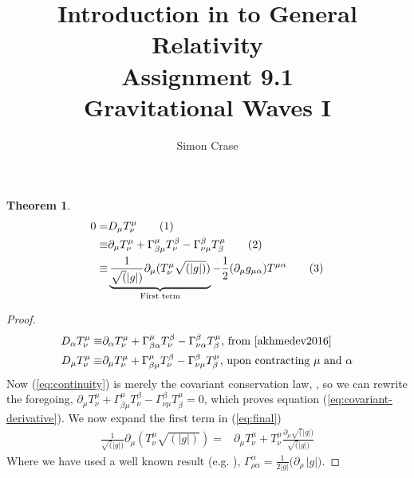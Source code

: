 \documentclass[]{article}
\title{Introduction in to General Relativity\\Assignment 9.1\\Gravitational Waves I}
\author{Simon Crase}
\newtheorem{theorem}{Theorem}
\newcommand\numberthis{\addtocounter{equation}{1}\tag{\theequation}}
\begin{document}
\maketitle


\begin{theorem}
	\begin{align*}
	0 =& D_{\mu} T^{\mu}_{\nu} \numberthis\label{eq:continuity} \\
	\equiv & \partial_{\mu} T^{\mu}_{\nu} + \Gamma^{\mu}_{\beta\mu}T^{\beta}_{\nu}-\Gamma^{\beta}_{\nu\mu}T^{\mu}_{\beta} \numberthis\label{eq:covariant-derivative}\\
	\equiv& \underbrace{\frac{1}{\sqrt(|g|)}\partial_{\mu}(T^{\mu}_{\nu}\sqrt{(|g|)})}_\text{First term} - \frac{1}{2}(\partial_{\mu}g_{\mu\alpha})T^{\mu\alpha} \numberthis\label{eq:final}
	\end{align*}
\end{theorem}

\begin{proof}
	\begin{align*}
	D_{\alpha} T^{\mu}_{\nu} 
	\equiv & \partial_{\alpha} T^{\mu}_{\nu} + \Gamma^{\mu}_{\beta\alpha}T^{\beta}_{\nu}-\Gamma^{\beta}_{\nu\alpha}T^{\mu}_{\beta} \text{, from \cite[(34)]{akhmedev2016}}\\
	D_{\mu} T^{\mu}_{\nu}
	\equiv & \partial_{\mu} T^{\mu}_{\nu} + \Gamma^{\mu}_{\beta\mu}T^{\beta}_{\nu}-\Gamma^{\beta}_{\nu\mu}T^{\mu}_{\beta}\text{, upon contracting $\mu$ and $\alpha$}
	\end{align*}
	Now (\ref{eq:continuity}) is merely the covariant conservation law, \cite[(80)]{akhmedev2016}, so we can rewrite the foregoing,
	$\partial_{\mu} T^{\mu}_{\nu} + \Gamma^{\mu}_{\beta\mu}T^{\beta}_{\nu}-\Gamma^{\beta}_{\nu\mu}T^{\mu}_{\beta}=0$, which proves equation (\ref{eq:covariant-derivative}).
	We now expand the first term in (\ref{eq:final})
	\begin{align*}
		\frac{1}{\sqrt(|g|)}\partial_{\mu}(T^{\mu}_{\nu}\sqrt{(|g|)}) =&\partial_{\mu}T^{\mu}_{\nu} + T^{\mu}_{\nu}\frac{\partial_{\mu}\sqrt(|g|)}{\sqrt(|g|)}
	\end{align*}
		Where we have used a well known result (e.g. \cite[equation (3.11)]{abs1965}), $\Gamma^{\alpha}_{\rho\alpha}=\frac{1}{2|g|}\big(\partial_\rho \, |g|\big)$.
\end{proof}
\end{document}
